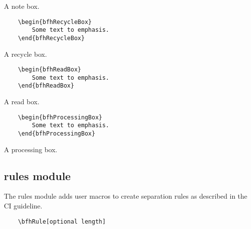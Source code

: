 \documentclass[
]{bfhpub}				%
\begin{document}
\begin{bfhNoteBox}
	A note box.
\end{bfhNoteBox}

\begin{verbatim}
	\begin{bfhRecycleBox}
		Some text to emphasis.
	\end{bfhRecycleBox}
\end{verbatim}

\begin{bfhRecycleBox}
	A recycle box.
\end{bfhRecycleBox}

\begin{verbatim}
	\begin{bfhReadBox}
		Some text to emphasis.
	\end{bfhReadBox}
\end{verbatim}

\begin{bfhReadBox}
	A read box.
\end{bfhReadBox}


\begin{verbatim}
	\begin{bfhProcessingBox}
		Some text to emphasis.
	\end{bfhProcessingBox}
\end{verbatim}

\begin{bfhProcessingBox}
	A processing box.
\end{bfhProcessingBox}

\subsection{rules module}
The rules module adds user macros to create separation rules as described in the CI guideline.

\begin{verbatim}
	\bfhRule[optional length]
\end{verbatim}

\bfhRule
\end{document}
